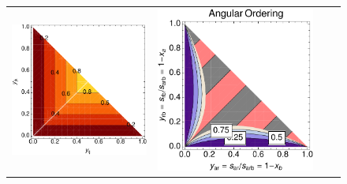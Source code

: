 \begin{figure}[t]
\begin{tabular}{cccc}
\includegraphics[scale=0.375]{ev2lin} & 
\includegraphics[scale=0.3225]{angord} &

\end{tabular}
\end{figure}
